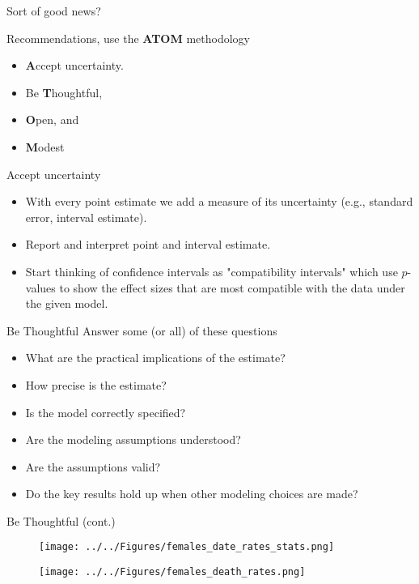 \documentclass{beamer}
\begin{document}
\begin{frame}{Sort of good news?}

Recommendations, use the \textbf{ATOM} methodology

\begin{itemize}
	\item  \textbf{A}ccept uncertainty. 
	\item Be \textbf{T}houghtful, 
	\item  \textbf{O}pen, and 
	\item \textbf{M}odest
\end{itemize}


\end{frame}

\begin{frame}{Accept uncertainty}
\begin{itemize}
	\item With every point estimate we add a measure of its uncertainty (e.g., standard error, interval estimate).
	\item Report and interpret point and interval estimate. 
	\item  Start thinking of confidence intervals as "compatibility intervals" which use $p$-values to show the effect sizes that are most compatible with the data under the given model.
\end{itemize}

\end{frame}

\begin{frame}{Be Thoughtful}
Answer some (or all) of these questions
\begin{itemize}
	\item What are the practical implications of the estimate?
	\item How precise is the estimate?
	\item Is the model correctly specified?
	\item Are the modeling assumptions understood?
	\item Are the assumptions valid?
	\item Do the key results hold up when other modeling choices are made?
\end{itemize}

\end{frame}

\begin{frame}{Be Thoughtful (cont.)}
\begin{figure}[!htb]
	\centering
	\begin{minipage}{.5\textwidth}
		\centering
		\texttt{[image: ../../Figures/females\_date\_rates\_stats.png]}
	\end{minipage}%
	\begin{minipage}{0.5\textwidth}
		\centering
		\texttt{[image: ../../Figures/females\_death\_rates.png]}
	\end{minipage}
\end{figure}

\end{frame}
\end{document}
